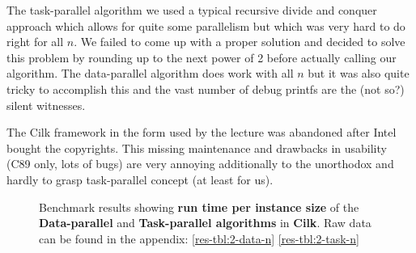 The task-parallel algorithm we used a typical recursive divide and conquer approach which allows for quite some parallelism but which was very hard to do right for all $n$.
We failed to come up with a proper solution and decided to solve this problem by rounding up to the next power of 2 before actually calling our algorithm.
The data-parallel algorithm does work with all $n$ but it was also quite tricky to accomplish this and the vast number of debug printfs are the (not so?) silent witnesses.

The Cilk framework in the form used by the lecture was abandoned after Intel bought the copyrights.
This missing maintenance and drawbacks in usability (C89 only, lots of bugs) are very annoying additionally to the unorthodox and hardly to grasp task-parallel concept (at least for us).

\cilktaskn
{}\cilkdatan
{}\cilkspeedup

\begin{figure}[h!]
\centering
{}
\caption{Benchmark results showing \textbf{run time per instance size} of the \textbf{Data-parallel} and \textbf{Task-parallel algorithms} in \textbf{Cilk}. Raw data can be found in the appendix: \autoref{res-tbl:2-data-n} \autoref{res-tbl:2-task-n}}
\label{plot:2-n}
\end{figure}

